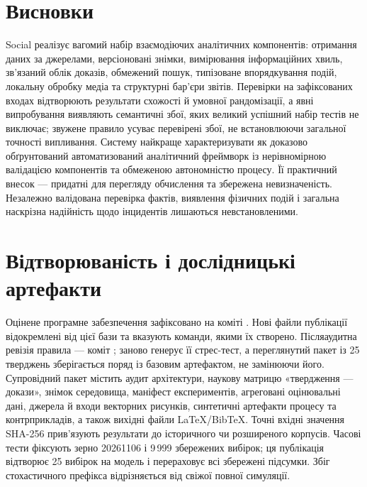 \section{Висновки}
Social реалізує вагомий набір взаємодіючих аналітичних компонентів: отримання даних за джерелами, версіоновані знімки, вимірювання інформаційних хвиль, зв'язаний облік доказів, обмежений пошук, типізоване впорядкування подій, локальну обробку медіа та структурні бар'єри звітів. Перевірки на зафіксованих входах відтворюють результати схожості й умовної рандомізації, а явні випробування виявляють семантичні збої, яких великий успішний набір тестів не виключає; звужене правило усуває перевірені збої, не встановлюючи загальної точності випливання. Систему найкраще характеризувати як доказово обґрунтований автоматизований аналітичний фреймворк із нерівномірною валідацією компонентів та обмеженою автономністю процесу. Її практичний внесок --- придатні для перегляду обчислення та збережена невизначеність. Незалежно валідована перевірка фактів, виявлення фізичних подій і загальна наскрізна надійність щодо інцидентів лишаються невстановленими.

\section*{Відтворюваність і дослідницькі артефакти}
Оцінене програмне забезпечення зафіксовано на коміті . Нові файли публікації відокремлені від цієї бази та вказують команди, якими їх створено. Післяаудитна ревізія правила --- коміт ;  заново генерує її стрес-тест, а переглянутий пакет із 25 тверджень зберігається поряд із базовим артефактом, не замінюючи його. Супровідний пакет містить аудит архітектури, наукову матрицю «твердження --- докази», знімок середовища, маніфест експериментів, агреговані оцінювальні дані, джерела й входи векторних рисунків, синтетичні артефакти процесу та контрприкладів, а також вихідні файли LaTeX/BibTeX. Точні вхідні значення SHA-256 прив'язують результати до історичного чи розширеного корпусів. Часові тести фіксують зерно 20261106 і 9\,999 збережених вибірок; ця публікація відтворює 25 вибірок на модель і перераховує всі збережені підсумки. Збіг стохастичного префікса відрізняється від свіжої повної симуляції.

